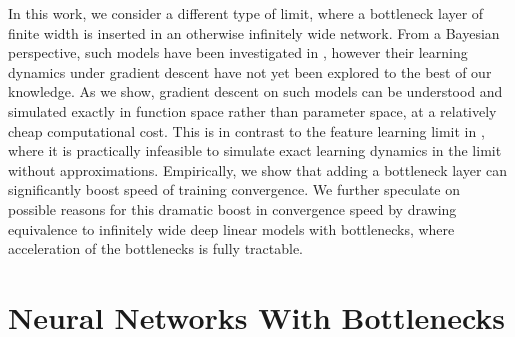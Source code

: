 \documentclass{article}
\theoremstyle{definition}
\theoremstyle{remark}
\renewcommand{\[}{\begin{eqnarray}}
\renewcommand{\]}{\end{eqnarray}}
\renewcommand{\[}{\begin{eqnarray}}
\renewcommand{\]}{\end{eqnarray}}
\begin{document}
In this work, we consider a different type of limit, where a bottleneck layer of finite width is inserted in an otherwise infinitely wide network. From a Bayesian perspective, such models have been investigated in \cite{Agrawal2020WideNN,Aitchison2020WhyBI}, however their learning dynamics under gradient descent have not yet been explored to the best of our knowledge. As we show, gradient descent on such models can be understood and simulated exactly in function space rather than parameter space, at a relatively cheap computational cost. This is in contrast to the feature learning limit in \cite{Yang2020FeatureLI}, where it is practically infeasible to simulate exact learning dynamics in the limit without approximations. Empirically, we show that adding a bottleneck layer can significantly boost speed of training convergence. We further speculate on possible reasons for this dramatic boost in convergence speed by drawing equivalence to infinitely wide deep linear models with bottlenecks, where acceleration of the bottlenecks is fully tractable. \\


\section{Neural Networks With Bottlenecks}\label{sec:bottle}
\end{document}
